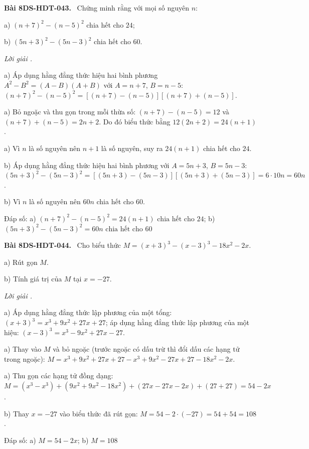 \documentclass[12pt,a4paper]{article}
\newenvironment{problem}[1][]{\par\medskip\noindent\textbf{Bài #1.}\ }{\par}
\newenvironment{solution}[1][]{\par\noindent\textit{Lời giải #1.}\par}{\par}
\begin{document}
\begin{problem}[8DS-HDT-043]
Chứng minh rằng với mọi số nguyên $n$:

a) $(n + 7)^2 - (n - 5)^2$ chia hết cho $24$;

b) $(5n + 3)^2 - (5n - 3)^2$ chia hết cho $60$.

\begin{solution}
a) Áp dụng hằng đẳng thức hiệu hai bình phương $A^2 - B^2 = (A - B)(A + B)$ với $A = n + 7$, $B = n - 5$: $(n + 7)^2 - (n - 5)^2 = \left[(n + 7) - (n - 5)\right]\left[(n + 7) + (n - 5)\right]$.

a) Bỏ ngoặc và thu gọn trong mỗi thừa số: $(n + 7) - (n - 5) = 12$ và $(n + 7) + (n - 5) = 2n + 2$. Do đó biểu thức bằng $12(2n + 2) = 24(n + 1)$.

a) Vì $n$ là số nguyên nên $n + 1$ là số nguyên, suy ra $24(n + 1)$ chia hết cho $24$.

b) Áp dụng hằng đẳng thức hiệu hai bình phương với $A = 5n + 3$, $B = 5n - 3$: $(5n + 3)^2 - (5n - 3)^2 = \left[(5n + 3) - (5n - 3)\right]\left[(5n + 3) + (5n - 3)\right] = 6 \cdot 10n = 60n$.

b) Vì $n$ là số nguyên nên $60n$ chia hết cho $60$.

Đáp số: a) $\boxed{(n + 7)^2 - (n - 5)^2 = 24(n + 1) \text{ chia hết cho } 24}$; b) $\boxed{(5n + 3)^2 - (5n - 3)^2 = 60n \text{ chia hết cho } 60}$
\end{solution}
\end{problem}

\begin{problem}[8DS-HDT-044]
Cho biểu thức $M = (x + 3)^3 - (x - 3)^3 - 18x^2 - 2x$.

a) Rút gọn $M$.

b) Tính giá trị của $M$ tại $x = -27$.

\begin{solution}
a) Áp dụng hằng đẳng thức lập phương của một tổng: $(x + 3)^3 = x^3 + 9x^2 + 27x + 27$; áp dụng hằng đẳng thức lập phương của một hiệu: $(x - 3)^3 = x^3 - 9x^2 + 27x - 27$.

a) Thay vào $M$ và bỏ ngoặc (trước ngoặc có dấu trừ thì đổi dấu các hạng tử trong ngoặc): $M = x^3 + 9x^2 + 27x + 27 - x^3 + 9x^2 - 27x + 27 - 18x^2 - 2x$.

a) Thu gọn các hạng tử đồng dạng: $M = (x^3 - x^3) + (9x^2 + 9x^2 - 18x^2) + (27x - 27x - 2x) + (27 + 27) = 54 - 2x$.

b) Thay $x = -27$ vào biểu thức đã rút gọn: $M = 54 - 2 \cdot (-27) = 54 + 54 = 108$.

Đáp số: a) $\boxed{M = 54 - 2x}$; b) $\boxed{M = 108}$
\end{solution}
\end{problem}
\end{document}
